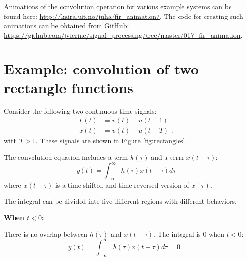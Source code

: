 Animations of the convolution operation for various example systems
can be found here: \url{http://kaira.uit.no/juha/fir_animation/}. The
code for creating such animations can be obtained from GitHub:
\url{https://github.com/jvierine/signal_processing/tree/master/017_fir_animation}.


\section{Example: convolution of two rectangle functions}
Consider the following two continuous-time signals:
\begin{align}
h(t) &= u(t)-u(t-1) \\
x(t) &= u(t)-u(t-T)\,\,.
\end{align}
with $T>1$. These signals are shown in Figure \ref{fig:rectangles}.

The convolution equation includes a term $h(\tau)$ and a term $x(t-\tau)$:
\begin{equation}
y(t)=\int_{-\infty}^{\infty}h(\tau)x(t-\tau)d\tau
\end{equation}
where $x(t-\tau)$ is a time-shifted and time-reversed version of
$x(\tau)$.

The integral can be divided into five different regions with different behaviors.

\noindent \textbf{When $t<0$:}

There is no overlap between $h(\tau)$ and $x(t-\tau)$. The integral is $0$ when $t<0$:
\begin{equation}
y(t) = \int_{-\infty}^{\infty} h(\tau)x(t-\tau)d\tau = 0\,\,.
\end{equation}

